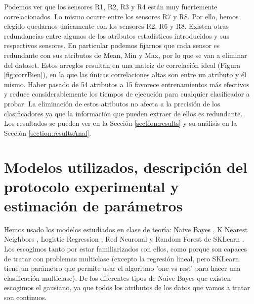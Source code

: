 \documentclass{esannV2}
\begin{document}
Podemos ver que los sensores R1, R2, R3 y R4 están muy fuertemente correlacionados. Lo mismo ocurre entre los sensores R7 y R8. Por ello, hemos elegido quedarnos únicamente con los sensores R2, R6 y R8. Existen otras redundancias entre algunos de los atributos estadísticos introducidos y sus respectivos sensores. En particular podemos fijarnos que cada sensor es redundante con sus atributos de Mean, Min y Max, por lo que se van a eliminar del dataset. Estos arreglos resultan en una matriz de correlación ideal (Figura \ref{fig:corrBien}), en la que las únicas correlaciones altas son entre un atributo y él mismo.
\newline\newline
Haber pasado de 54 atributos a 15 favorece entrenamientos más efectivos y reduce considerablemente los tiempos de ejecución para cualquier clasificador a probar. La eliminación de estos atributos no afecta a la precisión de los clasificadores ya que la información que pueden extraer de ellos es redundante. Los resultados se pueden ver en la Sección \ref{section:results} y su análisis en la Sección \ref{section:resultsAnal}.

\section{Modelos utilizados, descripción del protocolo experimental y estimación de parámetros}
Hemos usado los modelos estudiados en clase de teoría: Naive Bayes \cite{naive_bayes}, K Nearest Neighbors \cite{knn}, Logistic Regression \cite{LogisticRegression}, Red Neuronal \cite{neuralnetwork} y Random Forest \cite{randomforests} de SKLearn \cite{scikit-learn}. Los escogimos tanto por estar familiarizados con ellos, como porque son capaces de tratar con problemas multiclase (excepto la regresión lineal, pero SKLearn. tiene un parámetro que permite usar el algoritmo 'one vs rest' para hacer una clasificación multiclase). De los diferentes tipos de Naive Bayes que existen escogimos el gausiano, ya que todos los atributos de los datos que vamos a tratar son continuos.
\end{document}
